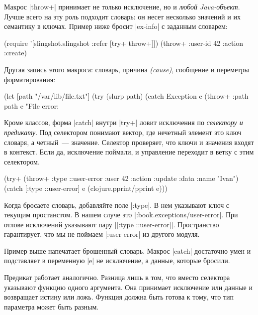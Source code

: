 Макрос \spverb|throw+| принимает не только исключение, но и \emph{любой
  Java-объект}. Лучше всего на эту роль подходит словарь: он несет несколько
значений и их семантику в ключах. Пример ниже бросит \spverb|ex-info| с заданным
словарем:

\begin{english}
  \begin{clojure}
(require '[slingshot.slingshot :refer [try+ throw+]])
(throw+ {:user-id 42 :action :create})
  \end{clojure}
\end{english}

Другая запись этого макроса: словарь, причина \emph{(cause)}, сообщение и
переметры форматирования:

\begin{english}
  \begin{clojure}
(let [path "/var/lib/file.txt"]
  (try
    (slurp path)
    (catch Exception e
      (throw+ {:path path} e "File error: %
  \end{clojure}
\end{english}

Кроме классов, форма \spverb|catch| внутри \spverb|try+| ловит исключения по
\emph{селектору и предикату}. Под селектором понимают вектор, где нечетный
элемент это ключ словаря, а четный~--- значение. Селектор проверяет, что ключи и
значения входят в контекст. Если да, исключение поймали, и управление переходит
в ветку с этим селектором.

\begin{english}
  \begin{clojure}
(try+
 (throw+ {:type ::user-error
          :user 42
          :action :update
          :data {:name "Ivan"}})
 (catch [:type ::user-error] e
   (clojure.pprint/pprint e)))
  \end{clojure}
\end{english}

Когда бросаете словарь, добавляйте поле \spverb|:type|. В нем указывают ключ с
текущим простанстом. В нашем случе это \spverb|:book.exceptions/user-error|. При
отлове исключений указывают пару \spverb|[:type ::user-error]|. Пространство
гарантирует, что мы не поймаем \spverb|:user-error| из другого модуля.

Пример выше напечатает брошенный словарь. Макрос \spverb|catch| достаточно умен
и подставляет в переменную \spverb|e| не исключение, а данные, которые бросили.

Предикат работает аналогично. Разница лишь в том, что вместо селектора указывают
функцию одного аргумента. Она принимает исключение или данные и возвращает
истину или ложь. Функция должна быть готова к тому, что тип параметра может быть
разным.

